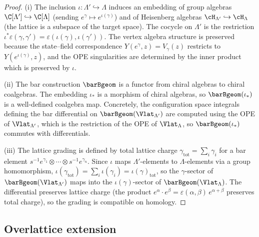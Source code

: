 \begin{proof}
(i) The inclusion $\iota \colon \Lambda' \hookrightarrow \Lambda$
induces an embedding of group algebras
$\C[\Lambda'] \hookrightarrow \C[\Lambda]$
(sending $e^\gamma \mapsto e^{\iota(\gamma)}$) and of Heisenberg
algebras $\cH_{\Lambda'} \hookrightarrow \cH_\Lambda$
(the lattice is a subspace of the target space).
The cocycle on $\Lambda'$ is the restriction
$\iota^*\varepsilon(\gamma, \gamma') = \varepsilon(\iota(\gamma),\iota(\gamma'))$.
The vertex algebra structure is preserved because
the state--field correspondence $Y(e^\gamma, z) = V_\gamma(z)$
restricts to $Y(e^{\iota(\gamma)}, z)$, and the OPE singularities
are determined by the inner product which is preserved by $\iota$.

(ii) The bar construction $\barBgeom$ is a functor from chiral algebras to
chiral coalgebras. The embedding $\iota_*$ is a morphism of chiral
algebras, so $\barBgeom(\iota_*)$ is a well-defined coalgebra map.
Concretely, the configuration space integrals defining the bar
differential on $\barBgeom(\Vlat_{\Lambda'})$ are computed using the
OPE of $\Vlat_{\Lambda'}$, which is the restriction of the OPE of
$\Vlat_\Lambda$, so $\barBgeom(\iota_*)$ commutes with differentials.

(iii) The lattice grading is defined by total lattice charge
$\gamma_{\mathrm{tot}} = \sum_i \gamma_i$ for a bar element
$s^{-1}e^{\gamma_1} \otimes \cdots \otimes s^{-1}e^{\gamma_n}$.
Since $\iota$ maps $\Lambda'$-elements to $\Lambda$-elements via a
group homomorphism,
$\iota(\gamma_{\mathrm{tot}}) = \sum_i \iota(\gamma_i) = \iota(\gamma)_{\mathrm{tot}}$,
so the $\gamma$-sector of $\barBgeom(\Vlat_{\Lambda'})$ maps into the
$\iota(\gamma)$-sector of $\barBgeom(\Vlat_\Lambda)$.
The differential preserves lattice charge (the product
$e^\alpha \cdot e^\beta = \varepsilon(\alpha,\beta)\,e^{\alpha+\beta}$
preserves total charge), so the grading is compatible on homology.
\end{proof}

\subsection{Overlattice extension}

